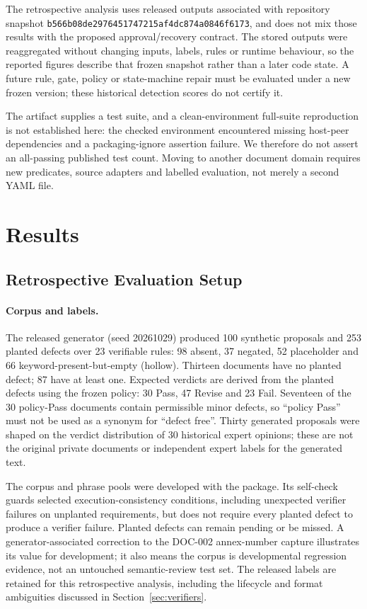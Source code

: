 \documentclass[computers,article,submit,moreauthors]{Definitions/mdpi}
\begin{document}
The retrospective analysis uses released outputs associated with repository snapshot \texttt{b566b08de2976451747215af4dc874a0846f6173}, and does not mix those results with the proposed approval/recovery contract. The stored outputs were reaggregated without changing inputs, labels, rules or runtime behaviour, so the reported figures describe that frozen snapshot rather than a later code state. A future rule, gate, policy or state-machine repair must be evaluated under a new frozen version; these historical detection scores do not certify it.

The artifact supplies a test suite, and a clean-environment full-suite reproduction is not established here: the checked environment encountered missing host-peer dependencies and a packaging-ignore assertion failure. We therefore do not assert an all-passing published test count. Moving to another document domain requires new predicates, source adapters and labelled evaluation, not merely a second YAML file.

\section{Results}\label{sec:results}

\subsection{Retrospective Evaluation Setup}

\paragraph{Corpus and labels.}
The released generator (seed 20261029) produced 100 synthetic proposals and 253 planted defects over 23 verifiable rules: 98 absent, 37 negated, 52 placeholder and 66 keyword-present-but-empty (hollow). Thirteen documents have no planted defect; 87 have at least one. Expected verdicts are derived from the planted defects using the frozen policy: 30 Pass, 47 Revise and 23 Fail. Seventeen of the 30 policy-Pass documents contain permissible minor defects, so ``policy Pass'' must not be used as a synonym for ``defect free''. Thirty generated proposals were shaped on the verdict distribution of 30 historical expert opinions; these are not the original private documents or independent expert labels for the generated text.

The corpus and phrase pools were developed with the package. Its self-check guards selected execution-consistency conditions, including unexpected verifier failures on unplanted requirements, but does not require every planted defect to produce a verifier failure. Planted defects can remain pending or be missed. A generator-associated correction to the DOC-002 annex-number capture illustrates its value for development; it also means the corpus is developmental regression evidence, not an untouched semantic-review test set. The released labels are retained for this retrospective analysis, including the lifecycle and format ambiguities discussed in Section~\ref{sec:verifiers}.
\end{document}
